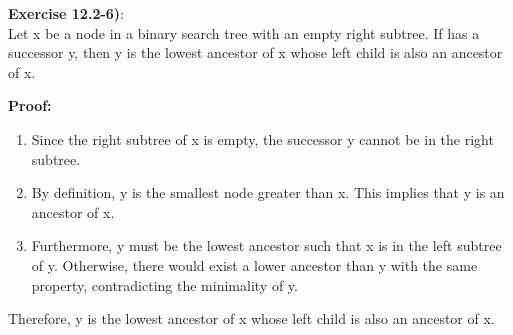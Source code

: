 \documentclass{article}
\newcounter{exercise}[section]   %
\begin{document}
\textbf{Exercise 12.2-6)}:\\
Let x be a node in a binary search tree  with an empty right subtree. If has a successor
y, then y is the lowest ancestor of x whose left child is also an ancestor of x.

\textbf{Proof:}
\begin{enumerate}
\item Since the right subtree of x is empty, the successor y cannot be in the right subtree.
\item By definition, y is the smallest node greater than x. This implies that y is an 
ancestor of x.
\item Furthermore, 
y must be the lowest ancestor such that x is in the left subtree of y. Otherwise, there 
would exist a lower ancestor than y with the same property, contradicting the minimality of
y.
\end{enumerate}
Therefore, y is the lowest ancestor of x whose left child is also an ancestor of x.
\end{document}
